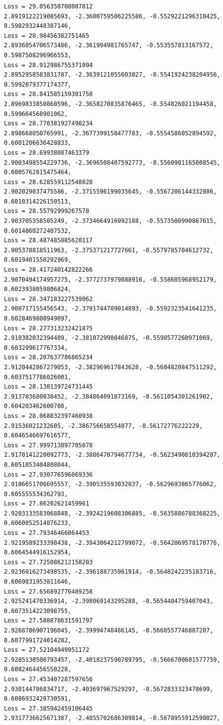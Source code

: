 \documentclass[11pt]{article}
\begin{document}
\begin{Verbatim}[commandchars=\\\{\}]
Loss = 29.056350708007812
2.8919122219085693, -2.3600759506225586, -0.5529221296310425,
0.5982932448387146,
Loss = 28.98456382751465
2.8936054706573486, -2.361994981765747, -0.553557813167572, 0.5987508296966553,
Loss = 28.912986755371094
2.8952958583831787, -2.3639121055603027, -0.5541924238204956,
0.5992079377174377,
Loss = 28.841585159301758
2.8969833850860596, -2.3658270835876465, -0.554826021194458, 0.599664568901062,
Loss = 28.770381927490234
2.898668050765991, -2.3677399158477783, -0.5554586052894592, 0.6001206636428833,
Loss = 28.69938087463379
2.9003498554229736, -2.3696508407592773, -0.5560901165008545,
0.6005762815475464,
Loss = 28.628559112548828
2.902029037475586, -2.3715596199035645, -0.5567206144332886, 0.6010314226150513,
Loss = 28.55792999267578
2.903705358505249, -2.3734664916992188, -0.5573500990867615, 0.6014860272407532,
Loss = 28.487485885620117
2.905378818511963, -2.375371217727661, -0.5579785704612732, 0.6019401550292969,
Loss = 28.417240142822266
2.9070494174957275, -2.3772737979888916, -0.558605968952179, 0.6023938059806824,
Loss = 28.347183227539062
2.908717155456543, -2.3791744709014893, -0.5592323541641235, 0.6028469800949097,
Loss = 28.277313232421875
2.910382032394409, -2.381072998046875, -0.5598577260971069, 0.603299617767334,
Loss = 28.207637786865234
2.9120442867279053, -2.382969617843628, -0.5604820847511292, 0.6037517786026001,
Loss = 28.138139724731445
2.913703680038452, -2.384864091873169, -0.5611054301261902, 0.604203462600708,
Loss = 28.068832397460938
2.91536021232605, -2.386756658554077, -0.56172776222229, 0.6046546697616577,
Loss = 27.999713897705078
2.9170141220092773, -2.3886470794677734, -0.5623490810394287,
0.6051053404808044,
Loss = 27.930776596069336
2.9186651706695557, -2.390535593032837, -0.5629693865776062, 0.605555534362793,
Loss = 27.86202621459961
2.9203133583068848, -2.3924219608306885, -0.5635886788368225,
0.6060052514076233,
Loss = 27.79346466064453
2.9219589233398438, -2.3943064212799072, -0.5642069578170776,
0.6064544916152954,
Loss = 27.725086212158203
2.9236016273498535, -2.396188735961914, -0.5648242235183716, 0.6069031953811646,
Loss = 27.656892776489258
2.925241470336914, -2.398069143295288, -0.5654404759407043, 0.6073514223098755,
Loss = 27.588878631591797
2.9268786907196045, -2.39994740486145, -0.5660557746887207, 0.6077991724014282,
Loss = 27.52104949951172
2.9285130500793457, -2.4018237590789795, -0.5666700601577759,
0.6082464456558228,
Loss = 27.453407287597656
2.930144786834717, -2.403697967529297, -0.5672833323478699, 0.6086932420730591,
Loss = 27.385942459106445
2.9317736625671387, -2.4055702686309814, -0.5678955912590027,

\end{Verbatim}
\end{document}
